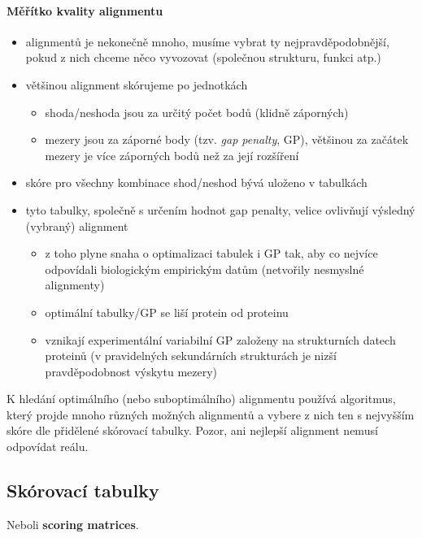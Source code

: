 \documentclass[DIV=8]{scrreprt}
\begin{document}
\paragraph{Měřítko kvality alignmentu}
\begin{itemize}[nosep]
    \item alignmentů je nekonečně mnoho, musíme vybrat ty nejpravděpodobnější, pokud z nich chceme něco vyvozovat (společnou strukturu, funkci atp.)
    \item většinou alignment skórujeme po jednotkách
\begin{itemize}[nosep]
    \item shoda/neshoda jsou za určitý počet bodů (klidně záporných)
    \item mezery jsou za záporné body (tzv. \emph{gap penalty}, GP), většinou za začátek mezery je více záporných bodů než za její rozšíření
\end{itemize}

    \item skóre pro všechny kombinace shod/neshod bývá uloženo v tabulkách
    \item tyto tabulky, společně s určením hodnot gap penalty, velice ovlivňují výsledný (vybraný) alignment
\begin{itemize}[nosep]
    \item z toho plyne snaha o optimalizaci tabulek i GP tak, aby co nejvíce odpovídali biologickým empirickým datům (netvořily nesmyslné alignmenty)
    \item optimální tabulky/GP se liší protein od proteinu
    \item vznikají experimentální variabilní GP založeny na strukturních datech proteinů (v pravidelných sekundárních strukturách je nizší pravděpodobnost výskytu mezery)
\end{itemize}

\end{itemize}



K hledání optimálního (nebo suboptimálního) alignmentu používá algoritmus, který projde mnoho různých možných alignmentů a vybere z nich ten s nejvyšším skóre dle přidělené skórovací tabulky. Pozor, ani nejlepší alignment nemusí odpovídat reálu.

\subsection{Skórovací tabulky} \label{Skórovací tabulky}


Neboli \textbf{scoring matrices}.
\end{document}
